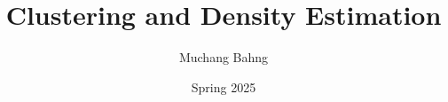 \documentclass{article}
\begin{document}
\title{Clustering and Density Estimation}
\author{Muchang Bahng}
\date{Spring 2025}

\maketitle
\tableofcontents
\pagebreak












\end{document}
